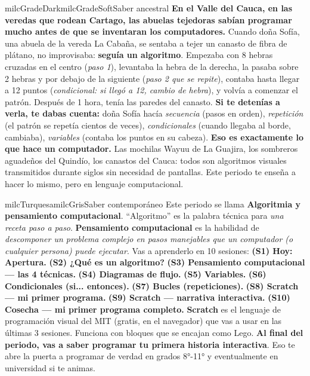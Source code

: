 \documentclass[11pt,letterpaper]{article}
\begin{document}
\begin{softbox}{milcGradeDark}{milcGradeSoft}{Saber ancestral}
\textbf{En el Valle del Cauca, en las veredas que rodean Cartago, las abuelas tejedoras sabían programar mucho antes de que se inventaran los computadores.} Cuando doña Sofía, una abuela de la vereda La Cabaña, se sentaba a tejer un canasto de fibra de plátano, no improvisaba: \textbf{seguía un algoritmo}. Empezaba con 8 hebras cruzadas en el centro (\emph{paso 1}), levantaba la hebra de la derecha, la pasaba sobre 2 hebras y por debajo de la siguiente (\emph{paso 2 que se repite}), contaba hasta llegar a 12 puntos (\emph{condicional: si llegó a 12, cambio de hebra}), y volvía a comenzar el patrón. Después de 1 hora, tenía las paredes del canasto. \textbf{Si te detenías a verla, te dabas cuenta:} doña Sofía hacía \emph{secuencia} (pasos en orden), \emph{repetición} (el patrón se repetía cientos de veces), \emph{condicionales} (cuando llegaba al borde, cambiaba), \emph{variables} (contaba los puntos en su cabeza). \textbf{Eso es exactamente lo que hace un computador.} Las mochilas Wayuu de La Guajira, los sombreros aguadeños del Quindío, los canastos del Cauca: todos son algoritmos visuales transmitidos durante siglos sin necesidad de pantallas. Este periodo te enseña a hacer lo mismo, pero en lenguaje computacional.
\end{softbox}

\begin{softbox}{milcTurquesa}{milcGris}{Saber contemporáneo}
Este periodo se llama \textbf{Algoritmia y pensamiento computacional}. ``Algoritmo'' es la palabra técnica para \emph{una receta paso a paso}. \textbf{Pensamiento computacional} es la habilidad de \emph{descomponer un problema complejo en pasos manejables que un computador (o cualquier persona) puede ejecutar}. Vas a aprenderlo en 10 sesiones: \textbf{(S1) Hoy: Apertura.} \textbf{(S2) ¿Qué es un algoritmo?} \textbf{(S3) Pensamiento computacional --- las 4 técnicas.} \textbf{(S4) Diagramas de flujo.} \textbf{(S5) Variables.} \textbf{(S6) Condicionales (si... entonces).} \textbf{(S7) Bucles (repeticiones).} \textbf{(S8) Scratch --- mi primer programa.} \textbf{(S9) Scratch --- narrativa interactiva.} \textbf{(S10) Cosecha --- mi primer programa completo.} \textbf{Scratch} es el lenguaje de programación visual del MIT (gratis, en el navegador) que vas a usar en las últimas 3 sesiones. Funciona con bloques que se encajan como Lego. \textbf{Al final del periodo, vas a saber programar tu primera historia interactiva}. Eso te abre la puerta a programar de verdad en grados 8°-11° y eventualmente en universidad si te animas.
\end{softbox}
\end{document}
